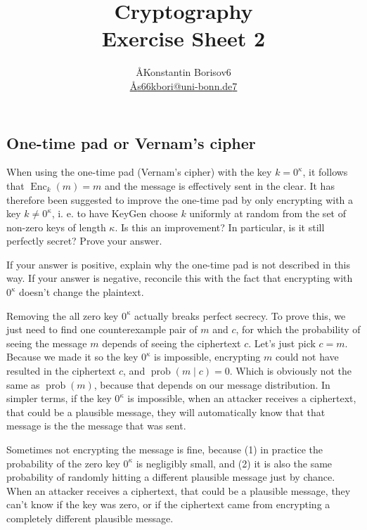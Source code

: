 \documentclass{article}
\title{Cryptography \\ Exercise Sheet 2}
\author{
  \AA{Konstantin Borisov}{6} \\
  \href{mailto:\AA{s66kbori@uni-bonn.de}{7}}{\AA{s66kbori@uni-bonn.de}{7}}
}
\begin{document}
  \maketitle

  \setcounter{section}{2}
  \subsection{One-time pad or Vernam's cipher}
  \begin{centerframebox}
    When using the one-time pad (Vernam's cipher) with the key $k = 0^\kappa$, it
    follows that $\operatorname{Enc}_k(m) = m$ and the message is effectively sent in the clear.
    It has therefore been suggested to improve the one-time pad by only encrypting with a key $k \neq 0^\kappa$,
    i. e. to have KeyGen choose $k$ uniformly at random from the set of non-zero keys of length $\kappa$.
    Is this an improvement? In particular, is it still perfectly secret? Prove your answer.

    If your answer is positive, explain why the one-time pad is not described
    in this way. If your answer is negative, reconcile this with the fact that
    encrypting with $0^\kappa$ doesn't change the plaintext.
  \end{centerframebox}
  Removing the all zero key $0^\kappa$ actually breaks perfect secrecy.
  To prove this, we just need to find one counterexample pair of $m$ and $c$,
  for which the probability of seeing the message $m$ depends of seeing the ciphertext $c$.
  Let's just pick $c = m$.
  Because we made it so the key $0^\kappa$ is impossible,
  encrypting $m$ could not have resulted in the ciphertext $c$, and $\operatorname{prob}(m \mid c) = 0$.
  Which is obviously not the same as $\operatorname{prob}(m)$, because that depends on our message distribution.
  In simpler terms, if the key $0^\kappa$ is impossible, when an attacker receives a ciphertext, that could be a plausible message,
  they will automatically know that that message is the the message that was sent.

  Sometimes not encrypting the message is fine, because
  (1) in practice the probability of the zero key $0^\kappa$ is negligibly small, and
  (2) it is also the same probability of randomly hitting a different plausible message just by chance.
  When an attacker receives a ciphertext, that could be a plausible message, they can't know if the key was zero,
  or if the ciphertext came from encrypting a completely different plausible message.
\end{document}
